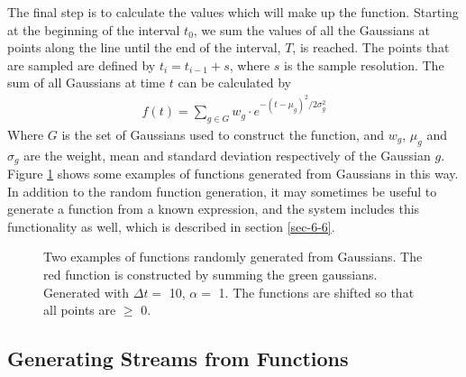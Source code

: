 \documentclass[a4paper,11pt]{article}
\begin{document}
   The final step is to calculate the values which will make up the
   function. Starting at the beginning of the interval $t_0$, we sum the values
   of all the Gaussians at points along the line until the end of the interval,
   $T$, is reached. The points that are sampled are defined by $t_i=t_{i-1}+s$,
   where $s$ is the sample resolution. The sum of all Gaussians at time $t$ can
   be calculated by
   \begin{align}
   f(t) = \sum_{g\in G}w_g\cdot e^{-(t-\mu_g)^2/2\sigma_g^2}
   \end{align}
   Where $G$ is the set of Gaussians used to construct the function, and $w_g$,
   $\mu_g$ and $\sigma_g$ are the weight, mean and standard deviation
   respectively of the Gaussian $g$. Figure \ref{fig:contrib} shows
   some examples of functions generated from Gaussians in this way. In addition
   to the random function generation, it may sometimes be useful to generate a
   function from a known expression, and the system includes this functionality
   as well, which is described in section \ref{sec-6-6}.
   \begin{figure}
   \caption{Two examples of functions randomly generated from Gaussians. The red
   function is constructed by summing the green gaussians. Generated with
   $\Delta t=$ 10, $\alpha=$ 1. The functions are shifted so that all points
   are $\geq$ 0.}
   \label{fig:contrib}
   \end{figure}
\subsection{Generating Streams from Functions}
\label{sec-3-2}
\end{document}
